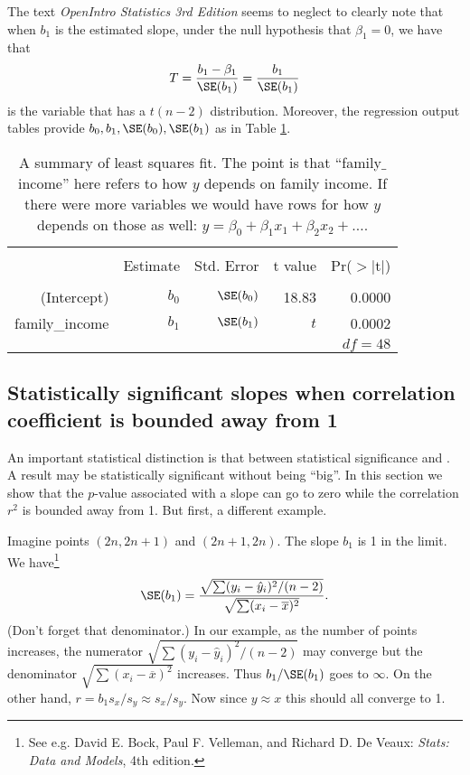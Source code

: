 The text \emph{OpenIntro Statistics 3rd Edition} seems to neglect to clearly note that when $b_1$ is the estimated slope, under the null hypothesis that $\beta_1=0$,
we have that
\[
	T = \frac{b_1-\beta_1}{\SE(b_1)} = \frac{b_1}{\SE(b_1)}
\]
is the variable that has a $t(n-2)$ distribution. Moreover, the regression output tables provide $b_0, b_1, \SE(b_0), \SE(b_1)$ as in Table \ref{nov19}.
\begin{table}%
\centering
\begin{tabular}{rrrrr}
  \hline
  \vspace{-3.7mm} & & & & \\
 & Estimate & Std. Error & t value & Pr($>$$|$t$|$) \\ 
  \hline
  \vspace{-3.6mm} & & & & \\
(Intercept) & $b_0$ & $\SE(b_0)$ & 18.83 & 0.0000 \\ 
family\_\hspace{0.3mm}income & $b_1$ & $\SE(b_1)$ & $t$ & 0.0002 \\ 
   \hline
   \multicolumn{5}{r}{$df=48$} \\
\end{tabular}
\caption{A summary of least squares fit. The point is that ``family$\_$income'' here refers to how $y$ depends on family income. If there were more variables we would have rows for how $y$ depends on those as well: $y=\beta_0 + \beta_1x_1+\beta_2x_2+\dots$.}
\label{nov19}
\end{table}



\subsection{Statistically significant slopes when correlation coefficient is bounded away from 1}%

An important statistical distinction is that between statistical significance and .
A result may be statistically significant without being ``big''.
In this section we show that the $p$-value associated with a slope can go to zero while the correlation $r^2$ is bounded away from 1.
But first, a different example.
\begin{example}{}
Imagine points $(2n,2n+1)$ and $(2n+1,2n)$. The slope $b_1$ is 1 in the limit. We have\footnote{See e.g. David E. Bock, Paul F. Velleman, and Richard D. De Veaux: \emph{Stats: Data and Models}, 4th edition.}
\[
	\SE(b_1) = \frac{\sqrt{\sum (y_i-\hat y_i)^2/(n-2)}}{\sqrt{\sum (x_i-\overline x)^2}}.
\]
(Don't forget that denominator.)
In our example, as the number of points increases, the numerator $\sqrt{\sum (y_i-\hat y_i)^2/(n-2)}$ may converge but the denominator $\sqrt{\sum (x_i-\overline x)^2}$ increases.
Thus $b_1/\SE(b_1)$ goes to $\infty$. On the other hand, $r =  b_1 s_x/s_y\approx s_x/s_y$. Now since $y\approx x$ this should all converge to 1.
\end{example}

